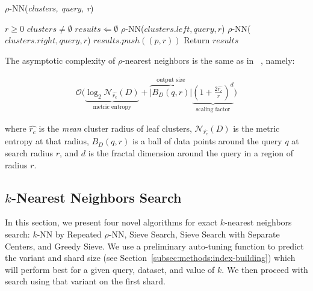 \begin{algorithm} 
    \caption{$\rho$-NN(\emph{clusters, query, r})} 
    \label{alg:rnn} 
    \begin{algorithmic}
        \REQUIRE $r \geq 0$
        \REQUIRE $clusters \neq \emptyset$
        \STATE $results \Leftarrow \emptyset$
                \STATE $\rho$-NN($clusters.left, query, r$)
            \ENDIF
        \ENDIF
                \STATE $\rho$-NN($clusters.right, query, r$)
            \ENDIF
        \ENDIF
                    \STATE $results.push((p, r))$
                \ENDIF
            \ENDFOR
        \ENDIF
        \STATE Return $results$
    \end{algorithmic}
    \end{algorithm}


The asymptotic complexity of $\rho$-nearest neighbors is the same as in ~\cite{ishaq2019clustered}, namely:

\begin{gather}
    \mathcal{O}\Bigg(
    \underbrace{\log_2 \mathcal{N}_{\hat{r_c}}(D)}_{\textrm{metric entropy}} +
    \overbrace{\left|B_D(q,r)\right|}^{\textrm{output size}}
    \underbrace{\left(1+\frac{2\hat{r_c}}{r}\right)^d}_{\textrm{scaling factor}}
     \Bigg)
     \label{hierarchical-complexity}
\end{gather}

where $\hat{r_c}$ is the \textit{mean} cluster radius of leaf clusters, $\mathcal{N}_{\hat{r_c}}(D)$ is the metric entropy at that radius, $B_D(q,r)$ is a ball of data points around the query $q$ at search radius $r$, and $d$ is the fractal dimension around the query in a region of radius $r$.

\subsection{\texorpdfstring{$k$}{k}-Nearest Neighbors Search}
\label{subsec:methods:knn-search}

In this section, we present four novel algorithms for exact $k$-nearest neighbors search: $k$-NN by Repeated $\rho$-NN, Sieve Search, Sieve Search with Separate Centers, 
and Greedy Sieve. 
We use a preliminary auto-tuning function to predict the variant and shard size (see Section~\ref{subsec:methods:index-building}) which will perform 
best for a given query, dataset, and value of $k$. We then proceed with search using that variant on the first shard. 

